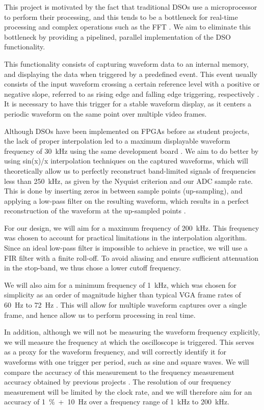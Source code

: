 \documentclass[journal]{IEEEtran}
\begin{document}
This project is motivated by the fact that traditional DSOs use a microprocessor to perform their processing, and this tends to be a bottleneck for real-time processing and complex operations such as the FFT \cite{tektronix_xyz_2016}. We aim to eliminate this bottleneck by providing a pipelined, parallel implementation of the DSO functionality.

This functionality consists of capturing waveform data to an internal memory, and displaying the data when triggered by a predefined event. This event usually consists of the input waveform crossing a certain reference level with a positive or negative slope, referred to as rising edge and falling edge triggering, respectively \cite{tektronix_xyz_2016}. It is necessary to have this trigger for a stable waveform display, as it centers a periodic waveform on the same point over multiple video frames.

Although DSOs have been implemented on FPGAs before as student projects, the lack of proper interpolation led to a maximum displayable waveform frequency of 30~kHz using the same development board \cite{jin_digital_2016}. We aim to do better by using sin(x)/x interpolation techniques on the captured waveforms, which will theoretically allow us to perfectly reconstruct band-limited signals of frequencies less than 250~kHz, as given by the Nyquist criterion and our ADC sample rate. This is done by inserting zeros in between sample points (up-sampling), and applying a low-pass filter on the resulting waveform, which results in a perfect reconstruction of the waveform at the up-sampled points \cite{rehorn_sin_2009}.

For our design, we will aim for a maximum frequency of 200~kHz. This frequency was chosen to account for practical limitations in the interpolation algorithm. Since an ideal low-pass filter is impossible to achieve in practice, we will use a FIR filter with a finite roll-off. To avoid aliasing and ensure sufficient attenuation in the stop-band, we thus chose a lower cutoff frequency.

We will also aim for a minimum frequency of 1~kHz, which was chosen for simplicity as an order of magnitude higher than typical VGA frame rates of 60~Hz to 72~Hz \cite{vga_timing}. This will allow for multiple waveform captures over a single frame, and hence allow us to perform processing in real time.

In addition, although we will not be measuring the waveform frequency explicitly, we will measure the frequency at which the oscilloscope is triggered. This serves as a proxy for the waveform frequency, and will correctly identify it for waveforms with one trigger per period, such as sine and square waves. We will compare the accuracy of this measurement to the frequency measurement accuracy obtained by previous projects \cite{jin_digital_2016}. The resolution of our frequency measurement will be limited by the clock rate, and we will therefore aim for an accuracy of 1~\%~+~10~Hz over a frequency range of 1~kHz to 200~kHz.
\end{document}
